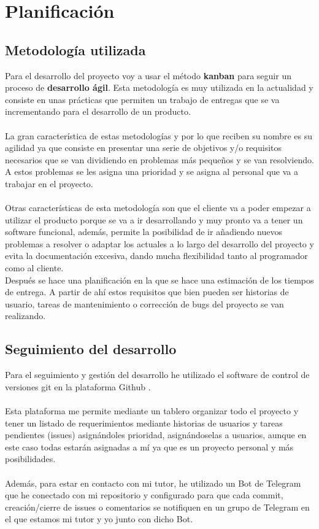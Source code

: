 \chapter{Planificación} \label{sec:planificacion}

\section{Metodología utilizada} \label{sec:metodologia}
Para el desarrollo del proyecto voy a usar el método \textbf{kanban} para seguir un proceso de \textbf{desarrollo ágil}.
Esta metodología es muy utilizada en la actualidad y consiste en unas prácticas que permiten un trabajo de entregas que se va incrementando para el desarrollo de un producto. \\\\
La gran característica de estas metodologías y por lo que reciben su nombre es su agilidad ya que consiste en presentar una serie de objetivos y/o requisitos necesarios que se van dividiendo en problemas más pequeños 
y se van resolviendo. A estos problemas se les asigna una prioridad y se asigna al personal que va a trabajar en el proyecto.\\\\
Otras características de esta metodología son que el cliente va a poder empezar a utilizar el producto porque se va a ir desarrollando y muy pronto va a tener un software funcional, 
además, permite la posibilidad de ir añadiendo nuevos problemas a resolver o adaptar los actuales a lo largo del desarrollo del proyecto y evita la documentación excesiva, dando mucha flexibilidad tanto al programador como al cliente.\\

Después se hace una planificación en la que se hace una estimación de los tiempos de entrega.
A partir de ahí estos requisitos que bien pueden ser historias de usuario, tareas de mantenimiento o corrección de bugs del proyecto se van realizando.
 
\newpage
\section{Seguimiento del desarrollo} \label{sec:seguimiento}

Para el seguimiento y gestión del desarrollo he utilizado el software de control de versiones
git \cite{git} en la plataforma Github \cite{Github}.\\\\
Esta plataforma me permite mediante un tablero organizar todo el proyecto
y tener un listado de requerimientos mediante historias de usuarios y tareas pendientes (issues) asignándoles
prioridad, asignándoselas a usuarios, aunque en este caso todas estarán asignadas a mí ya que es un proyecto personal 
y más posibilidades.\\\\
Además, para estar en contacto con mi tutor, he utilizado un Bot de Telegram que he conectado con mi repositorio y 
configurado para que cada commit, creación/cierre de issues o comentarios se notifiquen en un grupo de Telegram en el que estamos mi tutor y yo
junto con dicho Bot.\\


